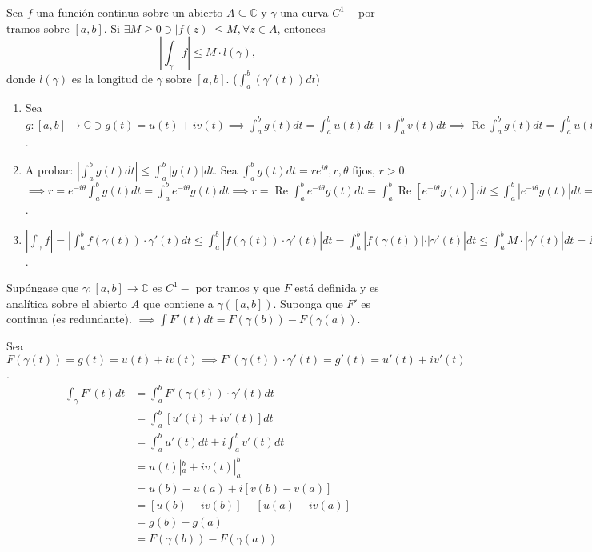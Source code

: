 \begin{prop}
    Sea $f$ una función continua sobre un abierto $A\subseteq \mathbb{C}$ y $\gamma$ una curva $C^1-$por tramos sobre $[a,b]$. Si $\exists M\geq 0\ni |f(z)|\leq M,\forall z\in A$, entonces
    $$\left| \int_\gamma f\right|\leq M\cdot l(\gamma),$$
    donde $l(\gamma)$ es la longitud de $\gamma$ sobre $[a,b]$. ($\int_a^b (\gamma'(t))dt$) 
    \begin{dem}
        \begin{enumerate}
            \item Sea $g:[a,b]\to\mathbb{C}\ni g(t)=u(t)+iv(t)\implies \int_a^b g(t)dt =\int_a^bu(t)dt+i\int_a^bv(t)dt\implies \operatorname{Re}\int_a^bg(t)dt=\int_a^bu(t)dt=\int_a^b\operatorname{Re}g(t)dt$.
            \item A probar: $\left| \int_a^b g(t)dt\right|\leq \int_a^b|g(t)|dt$. Sea $\int_a^b g(t)dt=re^{i\theta},r,\theta $ fijos, $r>0$. $\implies r=e^{-i\theta}\int_a^b g(t)dt =\int_a^b e^{-i\theta }g(t)dt\implies r=\operatorname{Re}\int_a^be^{-i\theta}g(t)dt=\int_a^b\operatorname{Re}[e^{-i\theta}g(t)]dt\leq \int_a^b |e^{-i\theta}g(t)|dt=\int_a^b|e^{-i\theta}|\cdot |g(t)|dt= \int_a^b |g(t)|dt\implies |r|=r=\left|e^{-i\theta}\int_a^b g(t)dt\right|=|e^{-i\theta}|\cdot |\int_a^b g(t)dt| = |\int_a^b g(t)dt|\leq \int_a^b |g(t)|dt$. 
            \item $\left| \int_\gamma f\right|=|\int_a^b f(\gamma(t))\cdot \gamma'(t)dt\leq \int_a^b|f(\gamma(t))\cdot \gamma'(t)|dt=\int_a^b|f(\gamma(t))|\cdot |\gamma'(t)|dt\leq \int_a^b M \cdot |\gamma'(t)|dt = M\int_a^b|\gamma'(t)|dt=M\cdot l(\gamma)$.
        \end{enumerate}
        
    \end{dem}
\end{prop}
 
\begin{prop}
    Supóngase que $\gamma:[a,b]\to \mathbb{C}$ es $C^1-$ por tramos y que $F$ está definida y es analítica sobre el abierto $A$ que contiene a $\gamma([a,b])$. Suponga que $F'$ es continua (es redundante). $\implies\int F'(t)dt =F(\gamma(b))-F(\gamma(a))$. 
    \begin{dem}
        Sea $F(\gamma(t))=g(t)=u(t)+iv(t)\implies F'(\gamma(t))\cdot \gamma'(t)=g'(t)=u'(t)+iv'(t)$.
        \begin{align*}
            \int_\gamma F'(t)dt &= \int_a^bF'(\gamma(t))\cdot \gamma'(t)dt\\
            &= \int_a^b [u'(t)+iv'(t)]dt\\
            &= \int_a^b u'(t)dt+i\int_a^b v'(t)dt\\
            &= u(t)|_a^b +iv(t)|_a^b\\
            &= u(b)-u(a)+i[v(b)-v(a)]\\
            &= [u(b)+iv(b)]-[u(a)+iv(a)]\\
            &= g(b)-g(a)\\
            &= F(\gamma(b))-F(\gamma(a))
        \end{align*}
    \end{dem} 
\end{prop}